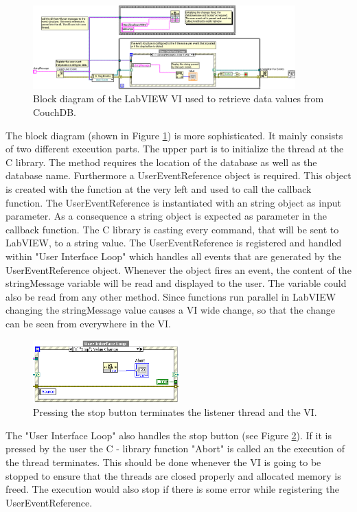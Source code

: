 \begin{figure}[h!]
  \centering
      \includegraphics[width=0.9\textwidth]{images/CouchDB2LabVIEW.png}
  \caption{Block diagram of the LabVIEW VI used to retrieve data values from CouchDB.}
  \label{figure:CouchDB2LabVIEW}
\end{figure}

The block diagram (shown in Figure \ref{figure:CouchDB2LabVIEW}) is more sophisticated. It mainly consists of two different execution parts. The upper part is to initialize the thread at the C library. The method requires the location of the database as well as the database name. Furthermore a UserEventReference object is required. This object is created with the function at the very left and used to call the callback function. The UserEventReference is instantiated with an string object as input parameter. As a consequence a string object is expected as parameter in the callback function. The C library is casting every command, that will be sent to LabVIEW, to a string value. The UserEventReference is registered and handled within "User Interface Loop" which handles all events that are generated by the UserEventReference object. Whenever the object fires an event, the content of the stringMessage variable will be read and displayed to the user. The variable could also be read from any other method. Since functions run parallel in LabVIEW changing the stringMessage value causes a VI wide change, so that the change can be seen from everywhere in the VI.\\
\begin{figure}[h!]
  \centering
      \includegraphics[width=0.5\textwidth]{images/CouchDB2LabVIEW_stop.png}
  \caption{Pressing the stop button terminates the listener thread and the VI.}
  \label{figure:CouchDB2LabVIEWstop}
\end{figure}
The "User Interface Loop" also handles the stop button (see Figure \ref{figure:CouchDB2LabVIEWstop}). If it is pressed by the user the C - library function "Abort" is called an the execution of the thread terminates. This should be done whenever the VI is going to be stopped to ensure that the threads are closed properly and allocated memory is freed. The execution would also stop if there is some error while registering the UserEventReference.

